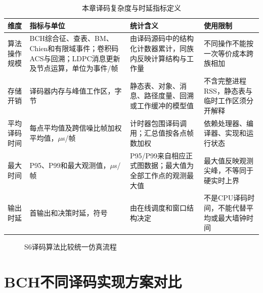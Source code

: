 \begin{table}[htbp]
  \centering
  \scriptsize
  \caption{本章译码复杂度与时延指标定义}
  \label{tab:s6-metric-definitions}
  \setlength{\tabcolsep}{2.2pt}
  \begin{tabular}{p{}p{}p{}p{}}
    \toprule
    维度 & 指标与单位 & 统计含义 & 使用限制 \\
    \midrule
    算法操作规模 & BCH综合征、查表、BM、Chien和有限域事件；卷积码ACS与回溯；LDPC消息更新及节点运算，单位为事件/帧 & 由译码源码中的结构化计数器累计，同族内反映计算结构与工作量 & 不同操作不能按一次等价成本跨族相加 \\
    存储开销 & 译码器内存与峰值工作区，字节 & 静态表、对象、消息、路径度量、回溯或工作缓冲的模型值 & 不含完整进程RSS，静态表与临时工作区须分开解释 \\
    平均译码时间 & 每点平均值及跨信噪比帧加权平均值，$\mu$s/帧 & 计时器包围译码调用；汇总值按各点帧数加权 & 依赖处理器、编译器、实现和运行状态 \\
    最大时间 & P95、P99和最大观测值，$\mu$s/帧 & P95/P99来自相应正式图数据；最大值为全部工作点的观测最大值 & 最大值反映观测尖峰，不等同于硬实时上界 \\
    输出时延 & 首输出和决策时延，符号 & 由在线调度和窗口结构决定 & 不是CPU译码时间，不能代替平均或最大墙钟时间 \\
    \bottomrule
  \end{tabular}
\end{table}

\begin{figure}[htbp]
  \centering
  \caption{S6译码算法比较统一仿真流程}
  \label{fig:s6-flow-placeholder}
\end{figure}

\section{BCH不同译码实现方案对比}

